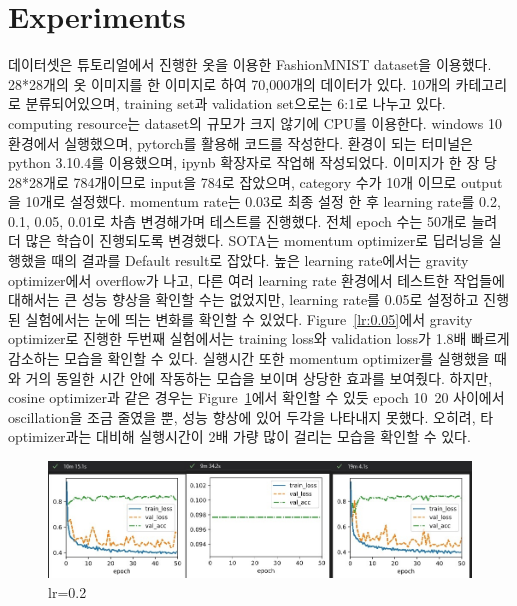 \documentclass{article}
\begin{document}
\section{Experiments}
데이터셋은 튜토리얼에서 진행한 옷을 이용한 FashionMNIST dataset을 이용했다. 28*28개의 옷 이미지를 한 이미지로 하여 70,000개의 데이터가 있다. 10개의 카테고리로 분류되어있으며, training set과 validation set으로는 6:1로 나누고 있다.
computing resource는 dataset의 규모가 크지 않기에 CPU를 이용한다. windows 10 환경에서 실행했으며, pytorch를 활용해 코드를 작성한다.
환경이 되는 터미널은 python 3.10.4를 이용했으며, ipynb 확장자로 작업해 작성되었다. 이미지가 한 장 당 28*28개로 784개이므로 input을 784로 잡았으며, category 수가 10개 이므로 output을 10개로 설정했다. momentum rate는 0.03로 최종 설정 한 후 learning rate를 0.2, 0.1, 0.05, 0.01로 차츰 변경해가며 테스트를 진행했다. 전체 epoch 수는 50개로 늘려 더 많은 학습이 진행되도록 변경했다.
SOTA는 momentum optimizer로 딥러닝을 실행했을 때의 결과를 Default result로 잡았다. 높은 learning rate에서는 gravity optimizer에서 overflow가 나고, 다른 여러 learning rate 환경에서 테스트한 작업들에 대해서는 큰 성능 향상을 확인할 수는 없었지만, learning rate를 0.05로 설정하고 진행된 실험에서는 눈에 띄는 변화를 확인할 수 있었다. Figure~\ref{lr:0.05}에서 gravity optimizer로 진행한 두번째 실험에서는 training loss와 validation loss가 1.8배 빠르게 감소하는 모습을 확인할 수 있다. 실행시간 또한 momentum optimizer를 실행했을 때와 거의 동일한 시간 안에 작동하는 모습을 보이며 상당한 효과를 보여줬다. 하지만, cosine optimizer과 같은 경우는 Figure~\ref{lr:0.2}에서 확인할 수 있듯 epoch 10~20 사이에서 oscillation을 조금 줄였을 뿐, 성능 향상에 있어 두각을 나타내지 못했다. 오히려, 타 optimizer과는 대비해 실행시간이 2배 가량 많이 걸리는 모습을 확인할 수 있다.

\begin{figure}[ht]
\begin{center}\centering
\includegraphics[width=\columnwidth]{img/lr0.2 m0.03.jpg}
\caption{lr=0.2}
\label{lr:0.2}
\end{center}
\end{figure}
\end{document}
